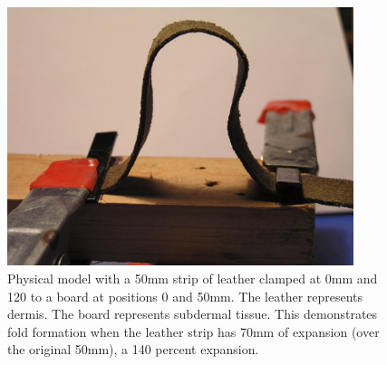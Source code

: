 %

\begin{figure}[!h]
  \centering
   \includegraphics[width=0.9\textwidth]{images/P1010019.JPG}
  \caption{Physical model with a 50mm strip of leather clamped at 0mm and 120 to a board at positions 0 and 50mm. The leather represents dermis. The board represents subdermal tissue. This demonstrates fold formation when the leather strip has 70mm of expansion (over the original 50mm), a 140 percent expansion.}
  \label{fig:model4}
\end{figure}

%

